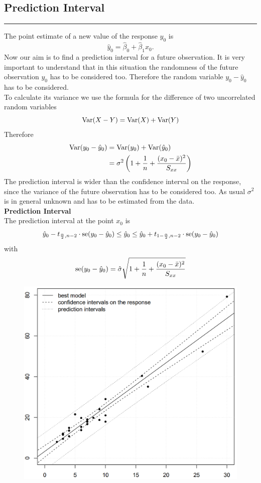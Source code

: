 \subsection{Prediction Interval}
\noindent\rule[\linienAbstand]{\linewidth}{\linienDicke}
The point estimate of a new value of the response $y_0$ is
\begin{equation}
  \hat{y}_0 = \hat{\beta}_0 +  \hat{\beta}_1 x_0.
\end{equation}
Now our aim is to find a prediction interval for a future observation. It is very important to understand that in this situation the randomness of the future observation $y_0$ has to be considered too. Therefore the random variable $y_0 - \hat{y}_0$ has to be considered.\\
To calculate its variance we use the formula for the difference of two uncorrelated random variables
\begin{equation}
  \textup{Var}(X - Y) = \textup{Var}(X) + \textup{Var}(Y)
\end{equation}
Therefore
\begin{equation}
  \begin{split}
      \textup{Var}(y_0 - \hat{y}_0) &= \textup{Var}(y_0) + \textup{Var}(\hat{y}_0)\\
      &= \sigma^2\left(1 + \frac{1}{n} + \frac{(x_0 - \bar{x})^2}{S_{xx}}\right)
  \end{split}
\end{equation}
The prediction interval is wider than the confidence interval on the response, since the variance of the future observation has to be considered too. As usual $\sigma^2$ is in general unknown and has to be estimated from the data.\\

\textbf{Prediction Interval}\\
The prediction interval at the point $x_0$ is
\begin{equation}
  \hat{y}_0 - t_{\frac{\alpha}{2},n-2} \cdot \textup{se}(y_0 - \hat{y}_0)
  \leq \hat{y}_0 \leq
  \hat{y}_0 + t_{1 - \frac{\alpha}{2},n-2} \cdot \textup{se}(y_0 - \hat{y}_0)
\end{equation}
with
\begin{equation}
  \textup{se}(y_0 - \hat{y}_0) = \hat{\sigma}\sqrt{1 + \frac{1}{n} + \frac{(x_0 - \bar{x})^2}{S_{xx}}}
\end{equation}

\begin{figure}[H]
  \centering
  \includegraphics[width=0.8\linewidth]{Pics/7.4.png}
\end{figure}
